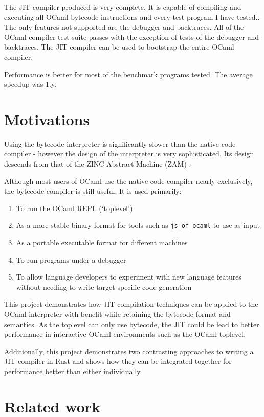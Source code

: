 The JIT compiler produced is very complete. It is capable of compiling and executing all OCaml
bytecode instructions and every test program I have tested.. The only features not supported are
the
debugger and backtraces. All of the OCaml compiler test suite passes with the exception of tests of
the debugger and backtraces. The JIT compiler can be used to bootstrap the entire OCaml compiler.

Performance is better for most of the benchmark programs tested. The average speedup was 1.y.

\section{Motivations}

Using the bytecode interpreter is significantly slower than the native code compiler - however
the design of the interpreter is very sophisticated. Its design descends from that of the ZINC
Abstract Machine (ZAM) \cite{zinc}.

Although most users of OCaml use the native code compiler nearly exclusively, the bytecode
compiler is still useful. It is used primarily:

\begin{enumerate}
      \item To run the OCaml REPL (`toplevel')
      \item As a more stable binary format for tools such as \texttt{js\_of\_ocaml} to use as input
      \item As a portable executable format for different machines
      \item To run programs under a debugger
      \item To allow language developers to experiment with new language features without needing
            to write target specific code generation
\end{enumerate}

This project demonstrates how JIT compilation techniques can be applied to the OCaml interpreter
with benefit while retaining the bytecode format and semantics. As the toplevel can only use
bytecode, the JIT could be lead to better performance in interactive OCaml environments such as the
OCaml toplevel.

Additionally, this project demonstrates two contrasting approaches to writing a JIT compiler in
Rust
and shows how they can be integrated together for performance better than either individually.

\section{Related work}

